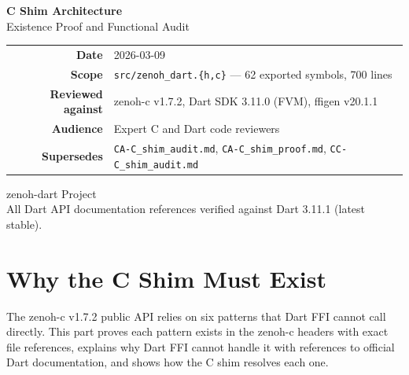 \documentclass[11pt,a4paper]{article}
\newcommand{\file}[1]{\texttt{#1}}
\begin{document}

\begin{titlepage}
\centering
\vspace*{3cm}

{\Huge\bfseries\sffamily C Shim Architecture}\\[0.5cm]
{\LARGE\sffamily Existence Proof and Functional Audit}\\[2cm]

\begin{tabular}{@{}r@{\quad}l@{}}
  \textbf{Date}       & 2026-03-09 \\[4pt]
  \textbf{Scope}      & \file{src/zenoh\_dart.\{h,c\}} --- 62 exported symbols, \raisebox{0.5ex}{\texttildelow}700 lines \\[4pt]
  \textbf{Reviewed against} & zenoh-c v1.7.2, Dart SDK 3.11.0 (FVM), ffigen v20.1.1 \\[4pt]
  \textbf{Audience}   & Expert C and Dart code reviewers \\[4pt]
  \textbf{Supersedes} & \file{CA-C\_shim\_audit.md}, \file{CA-C\_shim\_proof.md}, \file{CC-C\_shim\_audit.md} \\
\end{tabular}

\vfill

{\large\sffamily zenoh-dart Project}\\[0.5cm]
{\small All Dart API documentation references verified against Dart 3.11.1 (latest stable).}

\end{titlepage}

\tableofcontents
\clearpage
{}  %

\part{Why the C Shim Must Exist}
\label{part:why}

The zenoh-c v1.7.2 public API relies on six patterns that Dart FFI cannot
call directly. This part proves each pattern exists in the zenoh-c headers
with exact file references, explains why Dart FFI cannot handle it with
references to official Dart documentation, and shows how the C shim
resolves each one.
\end{document}
